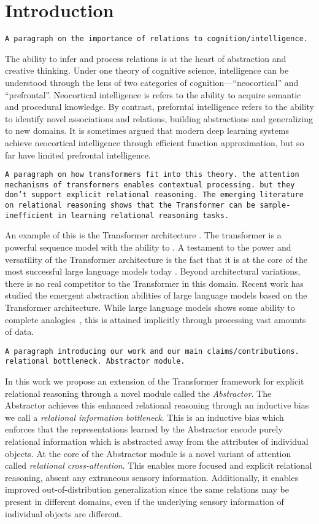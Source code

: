 \section{Introduction}

\texttt{A paragraph on the importance of relations to cognition/intelligence.}

The ability to infer and process relations is at the heart of abstraction and creative thinking. Under one theory of cognitive science, intelligence can be understood through the lens of two categories of cognition---``neocortical'' and ``prefrontal''. Neocortical intelligence is refers to the ability to acquire semantic and procedural knowledge. By contrast, preforntal intelligence refers to the ability to identify novel associations and relations, building abstractions and generalizing to new domains. It is sometimes argued that modern deep learning systems achieve neocortical intelligence through efficient function approximation, but so far have limited prefrontal intelligence.

\texttt{A paragraph on how transformers fit into this theory. the attention mechanisms of transformers enables contextual processing. but they don't support explicit relational reasoning. The emerging literature on relational reasoning shows that the Transformer can be sample-inefficient in learning relational reasoning tasks.}

An example of this is the Transformer architecture \citep{vaswani2017attention}. The transformer is a powerful sequence model with the ability to . A testament to the power and versatility of the Transformer architecture is the fact that it is at the core of the most successful large language models today \citep{gpt3,gpt4,llamma,T5,etc?}. Beyond architectural variations, there is no real competitor to the Transformer in this domain. Recent work has studied the emergent abstraction abilities of large language models based on the Transformer architecture. While large language models shows some ability to complete analogies~\citep{}, this is attained implicitly through processing vast amounts of data.

\texttt{A paragraph introducing our work and our main claims/contributions. relational bottleneck. Abstractor module.}

In this work we propose an extension of the Transformer framework for explicit relational reasoning through a novel module called the \textit{Abstractor}. The Abstractor achieves this enhanced relational reasoning through an inductive bias we call a \textit{relational information bottleneck}. This is an inductive bias which enforces that the representations learned by the Abstractor encode purely relational information which is abstracted away from the attributes of individual objects. At the core of the Abstractor module is a novel variant of attention called \textit{relational cross-attention}. This enables more focused and explicit relational reasoning, absent any extraneous sensory information. Additionally, it enables improved out-of-distribution generalization since the same relations may be present in different domains, even if the underlying sensory information of individual objects are different.

